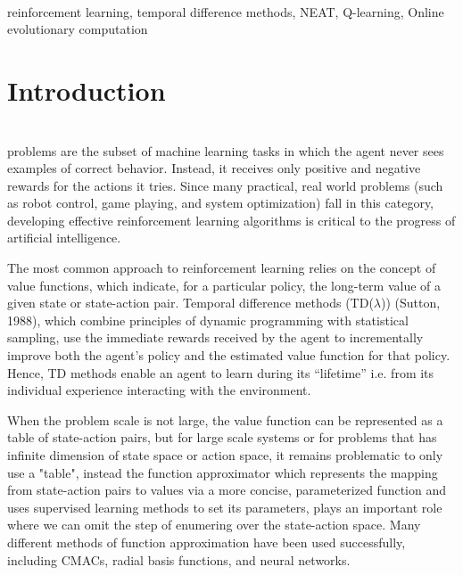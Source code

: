 \documentclass[journal]{IEEEtran}
\begin{document}
\ \\
\begin{IEEEkeywords}
  reinforcement learning, temporal difference methods, NEAT, Q-learning, Online evolutionary computation
\end{IEEEkeywords}






%
\IEEEpeerreviewmaketitle



\section{Introduction}

\ \\

 problems are the subset of machine learning tasks in which the agent never sees examples of correct behavior. Instead, it receives only positive and negative rewards for the actions it tries.
 Since many practical, real world problems (such as robot control, game playing, and system optimization) fall in this category, developing effective reinforcement learning algorithms is critical to the 
 progress of artificial intelligence.

 The most common approach to reinforcement learning relies on the concept of value functions, which indicate, for a particular policy, the long-term value of a given state or state-action pair. Temporal difference methods (TD($\lambda$)) (Sutton, 1988),
which combine principles of dynamic programming with statistical sampling, use the immediate rewards received by the agent to incrementally improve both the agent’s policy and the estimated 
 value function for that policy. Hence, TD methods enable an agent to learn during its “lifetime” i.e. from its individual experience interacting with the environment.

When the problem scale is not large, the value function can be represented as a table of state-action pairs, but for large scale systems or for problems that has infinite dimension of 
state space or action space, it remains problematic to only use a "table", instead the function approximator which represents the mapping from state-action pairs to values via a more concise,
parameterized function and uses supervised learning methods to set its parameters, plays an important role where we can omit the step of enumering over
the state-action space.  Many different methods of function approximation have been used successfully, including CMACs, radial basis functions, and neural networks.
\end{document}
